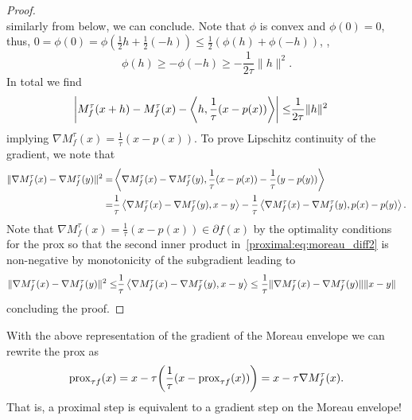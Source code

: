 \begin{proof}
\begin{equation}
    \end{equation}
    similarly from below, we can conclude. Note that $\phi$ is convex and $\phi(0) = 0$, thus, $0 = \phi(0) = \phi(\frac{1}{2}h + \frac{1}{2}(-h))\leq \frac{1}{2}(\phi(h) + \phi(-h))$, \ie,
    \begin{equation}
        \phi(h)\geq -\phi(-h) \geq -\frac{1}{2\tau}\|h\|^2.
    \end{equation}
    In total we find
    \begin{equation}
        \begin{aligned}
            \left|M^\tau_f(x+h) - M^\tau_f(x) - \left\langle h , \frac{1}{\tau}(x-p(x))\right\rangle\right|
            \leq & \frac{1}{2\tau}\|h\|^2
        \end{aligned}
    \end{equation}
    implying $\nabla M^\tau_f(x) = \frac{1}{\tau}(x-p(x))$. To prove Lipschitz continuity of the gradient, we note that
    \begin{equation}\label{proximal:eq:moreau_diff2}
        \begin{aligned}
            \|\nabla M^\tau_f(x) - \nabla M^\tau_f(y)\|^2
            =& \left\langle\nabla M^\tau_f(x) - \nabla M^\tau_f(y) , \frac{1}{\tau}(x-p(x)) - \frac{1}{\tau}(y-p(y))\right\rangle\\
            =& \frac{1}{\tau}\left\langle\nabla M^\tau_f(x) - \nabla M^\tau_f(y) , x - y\right\rangle
            - \frac{1}{\tau} \left\langle\nabla M^\tau_f(x) - \nabla M^\tau_f(y) , p(x)-p(y)\right\rangle.
        \end{aligned}
    \end{equation}
    Note that $\nabla M^\tau_f(x) = \frac{1}{\tau}(x-p(x))\in \partial f(x)$ by the optimality conditions for the prox so that the second inner product in~\eqref{proximal:eq:moreau_diff2} is non-negative by monotonicity of the subgradient leading to 
    \begin{equation}\label{proximal:eq:moreau_diff2}
        \begin{aligned}
            \|\nabla M^\tau_f(x) - \nabla M^\tau_f(y)\|^2
            \leq & \frac{1}{\tau}\left\langle\nabla M^\tau_f(x) - \nabla M^\tau_f(y) , x - y\right\rangle
            \leq\frac{1}{\tau}\|\nabla M^\tau_f(x) - \nabla M^\tau_f(y)\|\|x-y\|
        \end{aligned}
    \end{equation}
    concluding the proof.
\end{proof}

\begin{rem}
    With the above representation of the gradient of the Moreau envelope we can rewrite the prox as 
    \begin{equation}
        \mathrm{prox}_{\tau f}(x) 
        = x-\tau \bigg(\frac{1}{\tau}(x-\mathrm{prox}_{\tau f}(x))\bigg)
        = x-\tau \nabla M^\tau_f(x).
    \end{equation}
    That is, a proximal step is equivalent to a gradient step on the Moreau envelope!
\end{rem}

